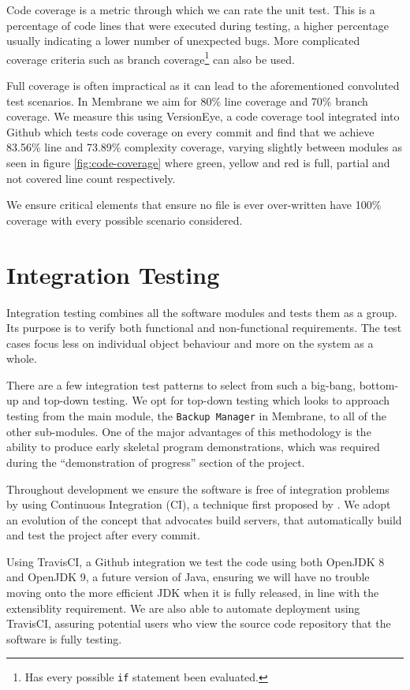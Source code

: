 \documentclass[11pt, a4paper, twocolumn, twoside]{report}
\def\code#1{\texttt{#1}}
\begin{document}
Code coverage is a metric through which we can rate the unit test. This is a percentage of code lines that were executed during testing, a higher percentage usually indicating a lower number of unexpected bugs. \citep{miller1963systematic} More complicated coverage criteria such as branch coverage\footnote{Has every possible \code{if} statement been evaluated.} can also be used.

Full coverage is often impractical as it can lead to the aforementioned convoluted test scenarios. In Membrane we aim for 80\% line coverage and 70\% branch coverage. We measure this using VersionEye, a code coverage tool integrated into Github which tests code coverage on every commit and find that we achieve 83.56\% line and 73.89\% complexity coverage, varying slightly between modules as seen in figure \ref{fig:code-coverage} where green, yellow and red is full, partial and not covered line count respectively.

We ensure critical elements that ensure no file is ever over-written have 100\% coverage with every possible scenario considered.

\section{Integration Testing}

Integration testing combines all the software modules and tests them as a group. Its purpose is to verify both functional and non-functional requirements. The test cases focus less on individual object behaviour and more on the system as a whole.

There are a few integration test patterns to select from such a big-bang, bottom-up and top-down testing. \citep{binder2000testing} We opt for top-down testing which looks to approach testing from the main module, the \code{Backup Manager} in Membrane, to all of the other sub-modules. One of the major advantages of this methodology is the ability to produce early skeletal program demonstrations, which was required during the ``demonstration of progress'' section of the project.

Throughout development we ensure the software is free of integration problems by using Continuous Integration (CI), a technique first proposed by \cite{booch1991object}. We adopt an evolution of the concept that advocates build servers, that automatically build and test the project after every commit. 

Using TravisCI, a Github integration we test the code using both OpenJDK 8 and OpenJDK 9, a future version of Java, ensuring we will have no trouble moving onto the more efficient JDK when it is fully released, in line with the extensiblity requirement. We are also able to automate deployment using TravisCI, assuring potential users who view the source code repository that the software is fully testing.
\end{document}
